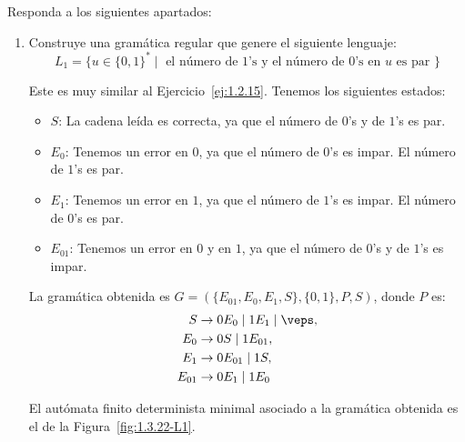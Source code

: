 \begin{ejercicio}\label{ej:1.3.22}
    Responda a los siguientes apartados:
    \begin{enumerate}
        \item Construye una gramática regular que genere el siguiente lenguaje:
            \begin{equation*}
                L_1 = \{u\in {\{0,1\}}^{\ast} \mid \text{ el número de 1's y el número de 0's en } u \text{ es par }\}
            \end{equation*}

            Este es muy similar al Ejercicio~\ref{ej:1.2.15}. Tenemos los siguientes estados:
            \begin{itemize}
                \item \ul{$S$}: La cadena leída es correcta, ya que el número de $0$'s y de $1$'s es par.
                \item \ul{$E_0$}: Tenemos un error en $0$, ya que el número de $0$'s es impar. El número de $1$'s es par.
                \item \ul{$E_1$}: Tenemos un error en $1$, ya que el número de $1$'s es impar. El número de $0$'s es par.
                \item \ul{$E_{01}$}: Tenemos un error en $0$ y en $1$, ya que el número de $0$'s y de $1$'s es impar.
            \end{itemize}
        
            La gramática obtenida es $G=(\{E_{01},E_0,E_1,S\}, \{0, 1\}, P, S)$, donde $P$ es:
            \begin{align*}
                S &\to 0E_0 \mid 1E_1 \mid \veps, \\
                E_0 &\to 0S \mid 1E_{01}, \\
                E_1 &\to 0E_{01} \mid 1S, \\
                E_{01} &\to 0E_1 \mid 1E_0
            \end{align*}

            El autómata finito determinista minimal asociado a la gramática obtenida es el de la Figura~\ref{fig:1.3.22-L1}.
            \begin{figure}
                \centering
\end{figure}
\end{enumerate}
\end{ejercicio}
